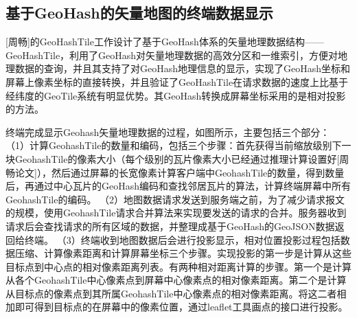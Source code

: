 \subsection{基于GeoHash的矢量地图的终端数据显示}
[周畅]的GeoHashTile工作设计了基于GeoHash体系的矢量地理数据结构——GeoHashTile，利用了GeoHash对矢量地理数据的高效分区和一维索引，方便对地理数据的查询，并且其支持了对GeoHash地理信息的显示，实现了GeoHash坐标和屏幕上像素坐标的直接转换，并且验证了GeoHashTile在请求数据的速度上比基于经纬度的GeoTile系统有明显优势。其GeoHash转换成屏幕坐标采用的是相对投影的方法。

终端完成显示Geohash矢量地理数据的过程，如图所示，主要包括三个部分：
（1）计算GeohashTile的数量和编码，包括三个步骤：首先获得当前缩放级别下一块GeohashTile的像素大小（每个级别的瓦片像素大小已经通过推理计算设置好[周畅论文]），然后通过屏幕的长宽像素计算客户端中GeohashTile的数量，得到数量后，再通过中心瓦片的GeoHash编码和查找邻居瓦片的算法，计算终端屏幕中所有GeohashTile的编码。
（2）地图数据请求发送到服务端之前，为了减少请求报文的规模，使用GeohashTile请求合并算法来实现要发送的请求的合并。服务器收到请求后会查找请求的所有区域的数据，并整理成基于GeoHash的GeoJSON数据返回给终端。
（3）终端收到地图数据后会进行投影显示，相对位置投影过程包括数据压缩、计算像素距离和计算屏幕坐标三个步骤。实现投影的第一步是计算从这些目标点到中心点的相对像素距离列表。有两种相对距离计算的步骤。第一个是计算从各个GeohashTile中心像素点到屏幕中心像素点的相对像素距离。第二个是计算从目标点的像素点到其所属GeohashTile中心像素点的相对像素距离。将这二者相加即可得到目标点的在屏幕中的像素位置，通过leaflet工具画点的接口进行投影。

